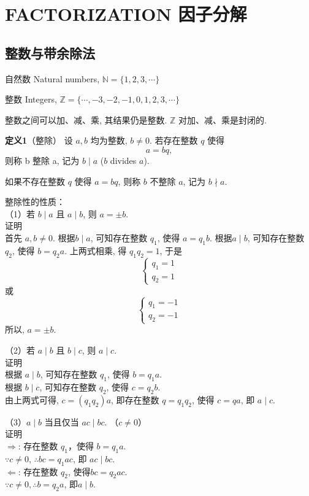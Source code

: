 \section{FACTORIZATION 因子分解}
\subsection{整数与带余除法}

自然数 Natural numbers, 
$ \mathbb{N} = \{ 1, 2, 3, \cdots \} $

整数 Integers, 
$ \mathbb{Z} = \{ \cdots, -3, -2, -1, 0, 1, 2, 3, \cdots \} $

整数之间可以加、减、乘, 其结果仍是整数. $ \mathbb{Z} $ 对加、减、乘是封闭的. 

\textbf{定义1}（整除） 设 $a, b$ 均为整数, $ b \neq 0 $. 若存在整数 $ q $ 使得
\[ 
    a = bq,
\]
则称 b 整除 a, 记为 $ b \mid a $ ($b$ divides $a$). 

如果不存在整数 $q$ 使得 $a=bq$, 则称 $b$ 不整除 $a$, 记为 $b \nmid a$. 

整除性的性质：\\
（1）若 $ b \mid a $ 且 $ a \mid b$, 则 $a = \pm b$.\\
证明\\
首先 $a,b\neq 0$.
根据$ b \mid a $, 可知存在整数 $q_1$, 使得 $a=q_1 b$. 
根据$ a \mid b$, 可知存在整数 $q_2$, 使得 $b=q_2 a$. 
上两式相乘, 得 $q_1 q_2 = 1$, 于是\\
\[
    \left\{ 
        \begin{array}{lc}
            q_1 = 1\\
            q_2 = 1
        \end{array}
    \right.
\]
或
\[
    \left\{ 
        \begin{array}{lc}
            q_1 = -1\\
            q_2 = -1
        \end{array}
    \right.
\]
所以, $a = \pm b$.

（2）若 $ a \mid b $ 且 $ b \mid c $, 则 $a \mid c$.\\
证明\\
根据 $a\mid b$, 可知存在整数 $q_1$, 使得 $b=q_1 a$.\\
根据 $b\mid c$, 可知存在整数 $q_2$, 使得 $c=q_2 b$.\\
由上两式可得, $c=(q_1q_2)a$, 即存在整数 $q=q_1q_2$, 使得 $c=qa$, 即 $a \mid c$.

（3）$a\mid b$ 当且仅当 $ac\mid bc$. （$c\neq 0$）\\
证明\\
$\Rightarrow$: 存在整数 $q_1$，使得 $b=q_1a$.\\
$\because c\neq 0$, $\therefore bc=q_1ac$, 即 $ac\mid bc$.\\
$\Leftarrow$: 存在整数  $q_2$, 使得$bc=q_2ac$.\\
$\because c\neq 0, \therefore b=q_2a$, 即$a\mid b$.

